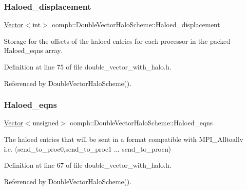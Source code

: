 \subsubsection{\texorpdfstring{Haloed\+\_\+displacement}{Haloed\_displacement}}
{\footnotesize\ttfamily \hyperlink{classoomph_1_1Vector}{Vector}$<$int$>$ oomph\+::\+Double\+Vector\+Halo\+Scheme\+::\+Haloed\+\_\+displacement\hspace{0.3cm}{\ttfamily [private]}}



Storage for the offsets of the haloed entries for each processor in the packed Haloed\+\_\+eqns array. 



Definition at line 75 of file double\+\_\+vector\+\_\+with\+\_\+halo.\+h.



Referenced by Double\+Vector\+Halo\+Scheme().

\mbox{\label{classoomph_1_1DoubleVectorHaloScheme_aac79c7fe19ec6fae41e2528a540d0eae}} 
\subsubsection{\texorpdfstring{Haloed\+\_\+eqns}{Haloed\_eqns}}
{\footnotesize\ttfamily \hyperlink{classoomph_1_1Vector}{Vector}$<$unsigned$>$ oomph\+::\+Double\+Vector\+Halo\+Scheme\+::\+Haloed\+\_\+eqns\hspace{0.3cm}{\ttfamily [private]}}



The haloed entries that will be sent in a format compatible with M\+P\+I\+\_\+\+Alltoallv i.\+e. (send\+\_\+to\+\_\+proc0,send\+\_\+to\+\_\+proc1 ... send\+\_\+to\+\_\+procn) 



Definition at line 67 of file double\+\_\+vector\+\_\+with\+\_\+halo.\+h.



Referenced by Double\+Vector\+Halo\+Scheme().

\mbox{\label{classoomph_1_1DoubleVectorHaloScheme_a13f0645d32135d7ffaedef8c888f7382}} 
